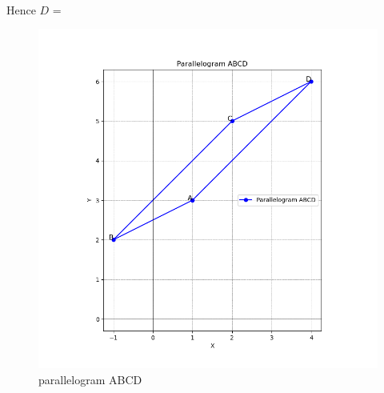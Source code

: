 \documentclass[journal]{IEEEtran}
\begin{document}
\\ Hence $D$ = 
\begin{figure}[h!]
	\centering
	\includegraphics[width=0.7\linewidth]{figure/Figure_1.png}
	\caption{parallelogram ABCD}
\end{figure}
\end{document}

